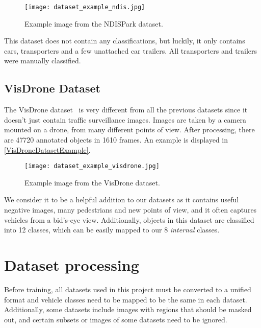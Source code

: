 \begin{figure}[t]
    \centering
    \texttt{[image: dataset\_example\_ndis.jpg]}
    \caption{Example image from the NDISPark dataset.}
    \label{NDISDatasetExample}
\end{figure}

This dataset does not contain any classifications, but luckily, it only contains
cars, transporters and a few unattached car trailers. All transporters and
trailers were manually classified.


\subsection{VisDrone Dataset}

The VisDrone dataset~\cite{Zhu2022} is very different from all the previous
datasets since it doesn't just contain traffic surveillance images. Images are
taken by a camera mounted on a drone, from many different points of view. After
processing, there are \num{47720} annotated objects in \num{1610} frames. An
example is displayed in \autoref{VisDroneDatasetExample}.


\begin{figure}[t]
    \centering
    \texttt{[image: dataset\_example\_visdrone.jpg]}
    \caption{Example image from the VisDrone dataset.}
    \label{VisDroneDatasetExample}
\end{figure}

We consider it to be a helpful addition to our datasets as it contains useful
negative images, many pedestrians and new points of view, and it often captures
vehicles from a bid's-eye view. Additionally, objects in this dataset are
classified into 12 classes, which can be easily mapped to our 8
\textit{internal} classes.


\section{Dataset processing}

Before training, all datasets used in this project must be converted to a
unified format and vehicle classes need to be mapped to be the same in each dataset.
Additionally, some datasets include images with regions that should be masked
out, and certain subsets or images of some datasets need to be ignored.

